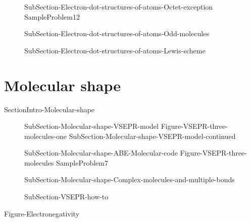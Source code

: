 \documentclass[main.tex]{subfiles}
\newcommand\chapterlabel{Ch-electronicstructure}\setcounter{figurenewcounter}{0}\setcounter{tablenewcounter}{0}\setcounter{formulanewcounter}{0}\chapterpicture{../{\chapterlabel}/figure1}\chapterpicturelabel{PxFuel}
\begin{document}
\begin{description}
\item[] {SubSection-Electron-dot-structures-of-atoms-Octet-exception}
{SampleProblem12}
\item[] {SubSection-Electron-dot-structures-of-atoms-Odd-molecules}
\newpage\vspace{2cm}\hspace{-4cm}{Table-Molecular-geometries}
\newpage
\item[]{SubSection-Electron-dot-structures-of-atoms-Lewis-scheme}  
\end{description}
 

\section{Molecular shape}{SectionIntro-Molecular-shape}
\sloppy\begin{description}
\item[] {SubSection-Molecular-shape-VSEPR-model}
{Figure-VSEPR-three-molecules-one}
 {SubSection-Molecular-shape-VSEPR-model-continued}
\item[] {SubSection-Molecular-shape-ABE-Molecular-code}
{Figure-VSEPR-three-molecules}
{SampleProblem7}
\item[] {SubSection-Molecular-shape-Complex-molecules-and-multiple-bonds}
\item[]{SubSection-VSEPR-how-to}  
\end{description}

{Figure-Electronegativity}	
\end{document}
